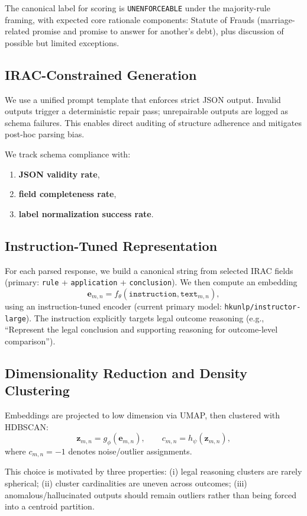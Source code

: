 \documentclass[11pt]{article}
\begin{document}
The canonical label for scoring is \texttt{UNENFORCEABLE} under the majority-rule framing, with expected core rationale components: Statute of Frauds (marriage-related promise and promise to answer for another's debt), plus discussion of possible but limited exceptions.

\subsection{IRAC-Constrained Generation}
We use a unified prompt template that enforces strict JSON output. Invalid outputs trigger a deterministic repair pass; unrepairable outputs are logged as schema failures. This enables direct auditing of structure adherence and mitigates post-hoc parsing bias.

We track schema compliance with:
\begin{enumerate}[leftmargin=1.5em]
    \item \textbf{JSON validity rate},
    \item \textbf{field completeness rate},
    \item \textbf{label normalization success rate}.
\end{enumerate}

\subsection{Instruction-Tuned Representation}
For each parsed response, we build a canonical string from selected IRAC fields (primary: \texttt{rule} + \texttt{application} + \texttt{conclusion}). We then compute an embedding
\[
\mathbf{e}_{m,n} = f_\theta(\texttt{instruction}, \texttt{text}_{m,n}),
\]
using an instruction-tuned encoder (current primary model: \texttt{hkunlp/instructor-large}). The instruction explicitly targets legal outcome reasoning (e.g., ``Represent the legal conclusion and supporting reasoning for outcome-level comparison'').

\subsection{Dimensionality Reduction and Density Clustering}
Embeddings are projected to low dimension via UMAP, then clustered with HDBSCAN:
\[
\mathbf{z}_{m,n} = g_\phi(\mathbf{e}_{m,n}), \qquad c_{m,n} = h_\psi(\mathbf{z}_{m,n}),
\]
where $c_{m,n} = -1$ denotes noise/outlier assignments.

This choice is motivated by three properties: (i) legal reasoning clusters are rarely spherical; (ii) cluster cardinalities are uneven across outcomes; (iii) anomalous/hallucinated outputs should remain outliers rather than being forced into a centroid partition.
\end{document}
